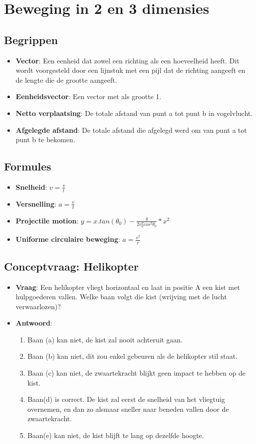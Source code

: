 \documentclass[12pt]{report}
\newcommand{\important}[1] {\textbf{\color{orange}#1}}
\begin{document}
\chapter{Beweging in 2 en 3 dimensies}
\section{Begrippen}
\begin{itemize}
\item {\important{Vector}: Een eenheid dat zowel een richting als een hoeveelheid heeft. Dit wordt voorgesteld door een lijnstuk met een pijl dat de richting aangeeft en de lengte die de grootte aangeeft.}
\item {\important{Eenheidsvector}: Een vector met als grootte 1.}
\item {\important{Netto verplaatsing}: De totale afstand van punt a tot punt b in vogelvlucht.}
\item {\important{Afgelegde afstand}: De totale afstand die afgelegd werd om van punt a tot punt b te bekomen.}
\end{itemize}

\section{Formules}
\begin{itemize}
  \item {\important{Snelheid}: $v = \frac{s}{t}$}
  \item {\important{Versnelling}: $a = \frac{v}{t}$}
  \item {\important{Projectile motion}: $y = x.tan(\theta_0) - \frac{g}{2v^{2}_0cos^2\theta_0}*x^2$}
  \item {\important{Uniforme circulaire beweging}: $a = \frac{v^2}{r}$}
\end{itemize}

\section{Conceptvraag: Helikopter}
\begin{itemize}
\item {\textbf{Vraag}: Een helikopter vliegt horizontaal en laat in positie A een kist met hulpgoederen vallen. Welke baan volgt die kist (wrijving met de lucht verwaarlozen)?}
\item {\textbf{Antwoord}: \begin{enumerate}
    \item {Baan (a) kan niet, de kist zal nooit achteruit gaan.}
    \item {Baan (b) kan niet, dit zou enkel gebeuren als de helikopter stil staat.}
    \item {Baan (c) kan niet, de zwaartekracht blijkt geen impact te hebben op de kist.}
    \item {Baan(d) is correct. De kist zal eerst de snelheid van het vliegtuig overnemen, en dan zo alsmaar sneller
        naar beneden vallen door de zwaartekracht.}
    \item {Baan(e) kan niet, de kist blijft te lang op dezelfde hoogte.}
    \end{enumerate}}
\end{itemize}
\end{document}
